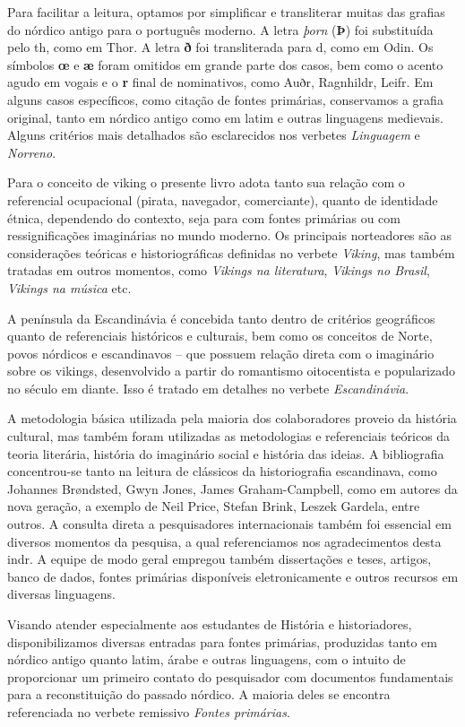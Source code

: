 Para facilitar a leitura, optamos por simplificar e transliterar muitas
das grafias do nórdico antigo para o português moderno. A letra
\emph{þorn} (\textbf{Þ}) foi substituída pelo th, como em Thor. A letra
\textbf{ð} foi transliterada para d, como em Odin. Os símbolos
\textbf{œ} e \textbf{æ} foram omitidos em grande parte dos casos, bem
como o acento agudo em vogais e o \textbf{r} final de nominativos, como
Auðr, Ragnhildr, Leifr. Em alguns casos específicos, como citação de
fontes primárias, conservamos a grafia original, tanto em nórdico antigo
como em latim e outras linguagens medievais. Alguns critérios mais
detalhados são esclarecidos nos verbetes \emph{Linguagem} e
\emph{Norreno}.

Para o conceito de viking o presente livro adota tanto sua relação com o
referencial ocupacional (pirata, navegador, comerciante), quanto de
identidade étnica, dependendo do contexto, seja para com fontes
primárias ou com ressignificações imaginárias no mundo moderno. Os
principais norteadores são as considerações teóricas e historiográficas
definidas no verbete \emph{Viking}, mas também tratadas em outros
momentos, como \emph{Vikings na literatura}, \emph{Vikings no Brasil},
\emph{Vikings na música} etc.

A península da Escandinávia é concebida tanto dentro de critérios
geográficos quanto de referenciais históricos e culturais, bem como os
conceitos de Norte, povos nórdicos e escandinavos -- que possuem relação
direta com o imaginário sobre os vikings, desenvolvido a partir do
romantismo oitocentista e popularizado no século  em diante. Isso é
tratado em detalhes no verbete \emph{Escandinávia}.

A metodologia básica utilizada pela maioria dos colaboradores proveio da
história cultural, mas também foram utilizadas as metodologias e
referenciais teóricos da teoria literária, história do imaginário social
e história das ideias. A bibliografia concentrou-se tanto na leitura de
clássicos da historiografia escandinava, como Johannes Brøndsted, Gwyn
Jones, James Graham-Campbell, como em autores da nova geração, a exemplo
de Neil Price, Stefan Brink, Leszek Gardela, entre outros. A consulta
direta a pesquisadores internacionais também foi essencial em diversos
momentos da pesquisa, a qual referenciamos nos agradecimentos desta indr. A equipe
de modo geral empregou também dissertações e teses, artigos, banco de
dados, fontes primárias disponíveis eletronicamente e outros recursos em
diversas linguagens.

Visando atender especialmente aos estudantes de História e
historiadores, disponibilizamos diversas entradas para fontes primárias,
produzidas tanto em nórdico antigo quanto latim, árabe e outras
linguagens, com o intuito de proporcionar um primeiro contato do
pesquisador com documentos fundamentais para a reconstituição do passado
nórdico. A maioria deles se encontra referenciada no verbete remissivo
\emph{Fontes primárias}.

